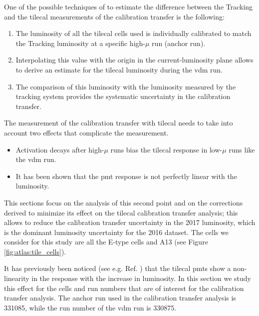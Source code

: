One of the possible techniques of to estimate 
the difference between the Tracking and the \gls{tilecal} measurements of the calibration transfer is the following:
\begin{enumerate}
\item The luminosity of all the \gls{tilecal} cells used is individually calibrated to match the Tracking luminosity 
at a specific high-$\mu$ run (anchor run).
\item Interpolating this value with the origin in the current-luminosity plane allows to derive an estimate for the \gls{tilecal} 
luminosity during the \gls{vdm} run.
\item The comparison of this luminosity with the luminosity measured by the tracking system provides the systematic uncertainty in the 
calibration transfer. 
\end{enumerate}
The measurement of the calibration transfer with \gls{tilecal} needs to take into account two effects that complicate the measurement. 
\begin{itemize}
\item Activation decays after high-$\mu$ runs bias the \gls{tilecal} response in low-$\mu$ runs like the \gls{vdm} run.
\item It has been shown that the \gls{pmt} response is not perfectly linear with the luminosity. 
\end{itemize}

This sections focus on the analysis of this second point and on the corrections derived to minimize its effect 
on the \gls{tilecal} calibration transfer analysis; this allows to reduce the calibration transfer uncertainty in the 
2017 luminosity, which is the dominant luminosity uncertainty for the 2016 dataset. 
The cells we consider for this study are all the E-type cells and A13 (see Figure \ref{fig:atlas:tile_cells}).

It has previously been noticed (see e.g. Ref. \cite{giulia:tesi}) that the \gls{tilecal} \glspl{pmt} show a non-linearity in 
the response with the increase in luminosity. 
In this section we study this effect for the cells and run numbers that are of interest for the 
calibration transfer analysis. 
The anchor run used in the calibration transfer analysis is 331085, while the run number of the \gls{vdm} 
run is 330875.


